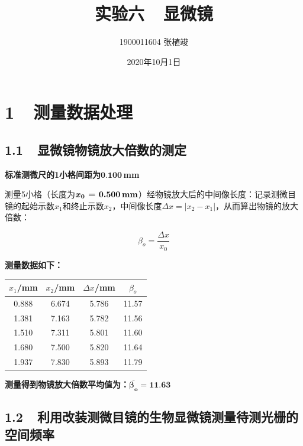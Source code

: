 \documentclass{ctexbook}
\begin{document}
\Large

\title{\textbf{实验六\ \ 显微镜}}
\author{\Large 1900011604 张植竣}
\date{\Large 2020年10月1日}

\maketitle

\newpage
\section*{ 1\ \ 测量数据处理}
\bigskip

\subsection*{ 1.1\ \ 显微镜物镜放大倍数的测定}

\noindent \textbf{标准测微尺的1小格间距为$\textbf{0.100}\,$mm}
\medskip

\noindent 测量5小格（长度为$\bm{x_0}\textbf{ = 0.500\,mm}$）经物镜放大后的中间像长度：记录测微目镜的起始示数$x_1$和终止示数$x_2$，中间像长度$\Delta x = |x_2 - x_1|$，从而算出物镜的放大倍数：

\[\beta_o = \frac{\Delta x}{x_0}\]

\noindent \textbf{测量数据如下：}
\begin{table}[ht!]
    \begin{center}
        \begin{tabular}{|c|c|c|c|}
            \hline
            $x_1$/mm & $x_2$/mm & $\Delta x$/mm & $\beta_o$ \\
            \hline
            0.888 & 6.674 & 5.786 & 11.57 \\
            \hline
            1.381 & 7.163 & 5.782 & 11.56 \\
            \hline
            1.510 & 7.311 & 5.801 & 11.60 \\
            \hline
            1.680 & 7.500 & 5.820 & 11.64 \\
            \hline
            1.937 & 7.830 & 5.893 & 11.79 \\
            \hline
        \end{tabular}
    \end{center}
\end{table}

\noindent \textbf{测量得到物镜放大倍数平均值为：}$\bm{\overline{\beta_o} =} \textbf{11.63}$

\bigskip
\subsection*{ 1.2\ \ 利用改装测微目镜的生物显微镜测量待测光栅的空间频率}
\end{document}
